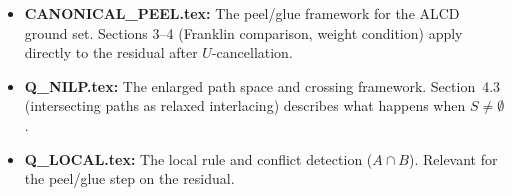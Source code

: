 \documentclass[11pt]{article}
\theoremstyle{plain}
\theoremstyle{definition}
\begin{document}
\begin{itemize}
  \item \textbf{CANONICAL\_PEEL.tex:}
    The peel/glue framework for the ALCD ground set.
    Sections 3--4 (Franklin comparison, weight condition)
    apply directly to the residual after $U$-cancellation.

  \item \textbf{Q\_NILP.tex:}
    The enlarged path space and crossing framework.
    Section~4.3 (intersecting paths as relaxed interlacing)
    describes what happens when $S \neq \emptyset$.

  \item \textbf{Q\_LOCAL.tex:}
    The local rule and conflict detection ($A \cap B$).
    Relevant for the peel/glue step on the residual.
\end{itemize}
\end{document}
